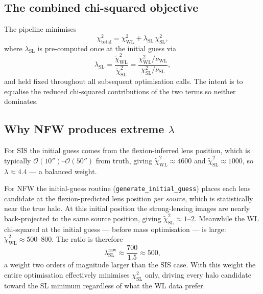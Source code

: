 \documentclass[12pt]{article}
\begin{document}
\subsection{The combined chi-squared objective}

The pipeline minimises
\begin{equation}
  \chi^2_\mathrm{total} = \chi^2_\mathrm{WL} + \lambda_\mathrm{SL}\,\chi^2_\mathrm{SL},
  \label{eq:total_chi2}
\end{equation}
where $\lambda_\mathrm{SL}$ is pre-computed once at the initial guess via
\begin{equation}
  \lambda_\mathrm{SL} = \frac{\tilde\chi^2_\mathrm{WL}}{\tilde\chi^2_\mathrm{SL}}
  = \frac{\chi^2_\mathrm{WL}/\nu_\mathrm{WL}}{\chi^2_\mathrm{SL}/\nu_\mathrm{SL}},
\end{equation}
and held fixed throughout all subsequent optimisation calls.  The intent is to
equalise the reduced chi-squared contributions of the two terms so neither dominates.

\subsection{Why NFW produces extreme \texorpdfstring{$\lambda$}{lambda}}

For SIS the initial guess comes from the flexion-inferred lens position, which is
typically $\mathcal{O}(10'')$--$\mathcal{O}(50'')$ from truth, giving
$\tilde\chi^2_\mathrm{WL}\approx 4600$ and $\tilde\chi^2_\mathrm{SL}\approx 1000$, so
$\lambda \approx 4.4$ --- a balanced weight.

For NFW the initial-guess routine (\texttt{generate\_initial\_guess}) places each lens
candidate at the flexion-predicted lens position \emph{per source}, which is
statistically near the true halo.  At this initial position the strong-lensing images
are nearly back-projected to the same source position, giving
$\tilde\chi^2_\mathrm{SL} \approx 1$--$2$.  Meanwhile the WL chi-squared at the initial
guess --- before mass optimisation --- is large:
$\tilde\chi^2_\mathrm{WL}\approx 500$--$800$.  The ratio is therefore
\begin{equation}
  \lambda_\mathrm{SL}^\mathrm{raw} \approx \frac{700}{1.5} \approx 500,
\end{equation}
a weight two orders of magnitude larger than the SIS case.  With this weight the
entire optimisation effectively minimises $\chi^2_\mathrm{SL}$ only, driving every
halo candidate toward the SL minimum regardless of what the WL data prefer.
\end{document}
